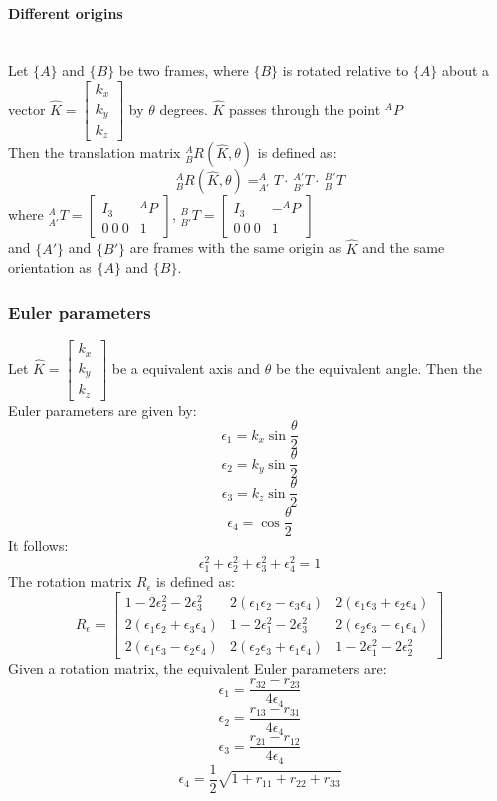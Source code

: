 \documentclass[10pt,a4paper]{article}
\newcommand{\vect}[1]{\ensuremath{\begin{bmatrix}#1\end{bmatrix}}}
\begin{document}
\paragraph{Different origins} ~\\
Let $\{A\}$ and $\{B\}$ be two frames, where $\{B\}$ is rotated relative to $\{A\}$ about a vector $\hat{K} = \vect{k_x \\ k_y \\ k_z}$ by $\theta$ degrees. $\hat{K}$ passes through the point $^AP$ \\
Then the translation matrix $^A_BR(\hat{K},\theta)$ is defined as: \\
$$
^A_BR(\hat{K}, \theta) = ^A_{A'}T ⋅~^{A'}_{B'}T ⋅~^{B'}_BT
$$
where $^A_{A'}T = \left[\begin{array}{c|c}
	I_3 & ^AP \\
	\hline
	0 ~0 ~0 & 1
\end{array}\right]$, 
$^B_{B'}T = \left[\begin{array}{c|c}
I_3 & -^AP \\
\hline
0 ~0 ~0 & 1
\end{array}\right]$ \\
and $\{A'\}$ and $\{B'\}$ are frames with the same origin as $\hat{K}$ and the same orientation as $\{A\}$ and $\{B\}$.

\subsubsection{Euler parameters}
Let $\hat{K} = \vect{k_x \\ k_y \\ k_z}$ be a equivalent axis and $\theta$ be the equivalent angle.
Then the Euler parameters are given by: \\
$$
	\epsilon_1 = k_x \sin \frac \theta 2
$$
$$
	\epsilon_2 = k_y \sin \frac \theta 2
$$
$$
	\epsilon_3 = k_z \sin \frac \theta 2
$$
$$
	\epsilon_4 = \cos \frac \theta 2
$$
It follows: \\
$$
	\epsilon_1^2 + \epsilon_2^2 + \epsilon_3^2 + \epsilon_4^2 = 1
$$
The rotation matrix $R_\epsilon$ is defined as:
$$
	R_\epsilon = \begin{bmatrix}
		1 - 2\epsilon_2^2 - 2\epsilon_3^2 & 2(\epsilon_1\epsilon_2 - \epsilon_3\epsilon_4) & 2(\epsilon_1\epsilon_3 + \epsilon_2\epsilon_4) \\
		2(\epsilon_1\epsilon_2 + \epsilon_3\epsilon_4) & 1 - 2\epsilon_1^2 - 2\epsilon_3^2 & 2(\epsilon_2\epsilon_3 - \epsilon_1\epsilon_4) \\
		2(\epsilon_1\epsilon_3 - \epsilon_2\epsilon_4) & 2(\epsilon_2\epsilon_3 + \epsilon_1\epsilon_4) & 1 - 2\epsilon_1^2 - 2\epsilon_2^2
	\end{bmatrix}
$$
Given a rotation matrix, the equivalent Euler parameters are:
$$
	\epsilon_1 = \frac{r_{32} - r_{23}}{4\epsilon_4}
$$
$$
	\epsilon_2 = \frac{r_{13} - r_{31}}{4\epsilon_4}
$$
$$
	\epsilon_3 = \frac{r_{21} - r_{12}}{4\epsilon_4}
$$
$$
	\epsilon_4 = \frac 1 2 \sqrt{1 + r_{11} + r_{22} + r_{33}}
$$
\end{document}
